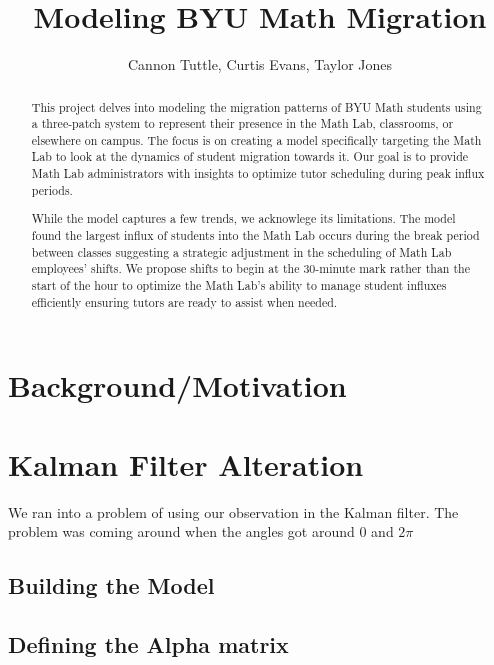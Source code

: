 \documentclass[11pt]{amsart}
\begin{document}
\title{Modeling BYU Math Migration}
\author{Cannon Tuttle, Curtis Evans, Taylor Jones}

\date{}

\maketitle

\begin{abstract}
    This project delves into modeling the migration patterns of BYU Math students using a three-patch 
    system to represent their presence in the Math Lab, classrooms, or elsewhere on campus. The focus is on creating 
    a model specifically targeting the Math Lab to look at the dynamics of student migration towards it. 
    Our goal is to provide Math Lab administrators with insights to optimize tutor scheduling during peak influx periods.
    
    While the model captures a few trends, we acknowlege its limitations. The model found the largest influx of students into the Math 
    Lab occurs during the break period between classes suggesting a strategic adjustment in the scheduling of Math Lab 
    employees' shifts. We propose shifts to begin at the 30-minute mark rather than the start of the hour to 
    optimize the Math Lab's ability to manage student influxes efficiently ensuring tutors are ready to assist when 
    needed.
\end{abstract}

\section{Background/Motivation}



\section{Kalman Filter Alteration}
We ran into a problem of using our observation in the Kalman filter. The problem was coming around when the angles got around $0$
and $2\pi$

\subsection{Building the Model} 


\subsection{Defining the Alpha matrix}
\end{document}
